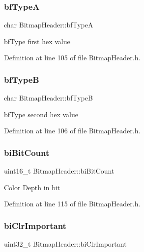\subsubsection{\texorpdfstring{bfTypeA}{bfTypeA}}
{\footnotesize\ttfamily char Bitmap\+Header\+::bf\+TypeA\hspace{0.3cm}{\ttfamily [private]}}

bf\+Type first hex value 

Definition at line 105 of file Bitmap\+Header.\+h.

\mbox{\label{classBitmapHeader_a3fbb12d28c1be3095b72a5eebeaa4445}} 
\subsubsection{\texorpdfstring{bfTypeB}{bfTypeB}}
{\footnotesize\ttfamily char Bitmap\+Header\+::bf\+TypeB\hspace{0.3cm}{\ttfamily [private]}}

bf\+Type second hex value 

Definition at line 106 of file Bitmap\+Header.\+h.

\mbox{\label{classBitmapHeader_a9156116cca1502fb3f49f3da3890c70d}} 
\subsubsection{\texorpdfstring{biBitCount}{biBitCount}}
{\footnotesize\ttfamily uint16\+\_\+t Bitmap\+Header\+::bi\+Bit\+Count\hspace{0.3cm}{\ttfamily [private]}}

Color Depth in bit 

Definition at line 115 of file Bitmap\+Header.\+h.

\mbox{\label{classBitmapHeader_ad90b0f2883207798cdd26f69af5510ba}} 
\subsubsection{\texorpdfstring{biClrImportant}{biClrImportant}}
{\footnotesize\ttfamily uint32\+\_\+t Bitmap\+Header\+::bi\+Clr\+Important\hspace{0.3cm}{\ttfamily [private]}}

